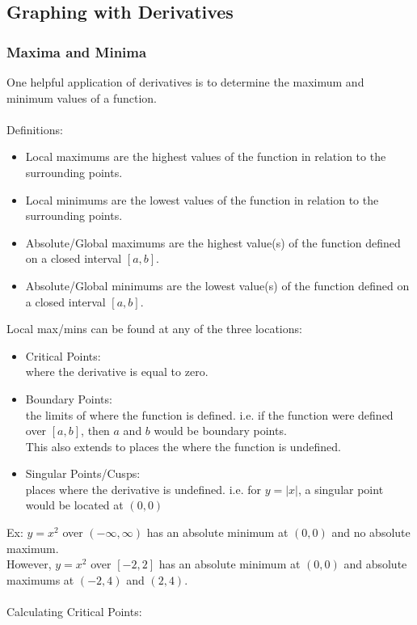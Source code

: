 \documentclass[11pt, fleqn]{article}
\begin{document}
\subsection{Graphing with Derivatives}

\subsubsection{Maxima and Minima}
One helpful application of derivatives is to determine the maximum and minimum values of a function.\\
\\
Definitions:
\begin{itemize}
    \item Local maximums are the highest values of the function in relation to the surrounding points.
    \item Local minimums are the lowest values of the function in relation to the surrounding points.
    \item Absolute/Global maximums are the highest value(s) of the function defined on a closed interval $[a,b]$.
    \item Absolute/Global minimums are the lowest value(s) of the function defined on a closed interval $[a,b]$.
\end{itemize}
Local max/mins can be found at any of the three locations:
\begin{itemize}
    \item Critical Points:\\
    where the derivative is equal to zero.
    \item Boundary Points:\\
    the limits of where the function is defined. i.e. if the function were defined over $[a,b]$, then $a$ and $b$ would be boundary points.\\
    This also extends to places the where the function is undefined.
    \item Singular Points/Cusps:\\
    places where the derivative is undefined. i.e. for $y=|x|$, a singular point would be located at $(0,0)$
\end{itemize}
Ex: $y=x^2$ over $(-\infty,\infty)$ has an absolute minimum at $(0,0)$ and no absolute maximum.\\
However, $y=x^2$ over $[-2,2]$ has an absolute minimum at $(0,0)$ and absolute maximums at $(-2,4)$ and $(2,4)$.\\
\\
Calculating Critical Points:\\
\end{document}
